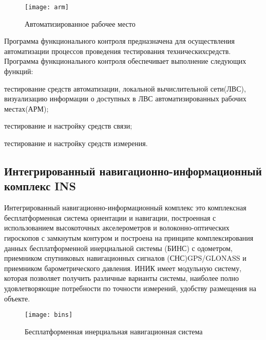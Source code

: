\begin{figure}[ht]
	\centering
	\texttt{[image: arm]}
	\caption{Автоматизированное рабочее место}
	\label{fig:lit_reiview:analytics:arm}
\end{figure}

Программа функционального контроля предназначена для осуществления автоматизации процессов проведения тестирования
технических\break средств.
Программа функционального контроля обеспечивает выполнение следующих функций:
\begin{legal}
    \item тестирование средств автоматизации, локальной вычислительной сети(ЛВС), визуализацию информации о доступных в ЛВС автоматизированных рабочих местах(АРМ);
    \item тестирование и настройку средств связи;
    \item тестирование и настройку средств измерения.
\end{legal}

\subsection{Интегрированный навигационно-информационный комплекс INS}
\label{sub:lit_review:ins}

Интегрированный навигационно-информационный комплекс это комплексная бесплатформенная система ориентации и навигации,
построенная с использованием высокоточных акселерометров и волоконно-оптических гироскопов с замкнутым контуром и
построена на принципе комплексирования данных бесплатформенной инерциальной системы (БИНС) с одометром, приемником
спутниковых навигационных сигналов (СНС)\break GPS/GLONASS и приемником барометрического давления.
ИНИК имеет модульную систему, которая позволяет получить различные варианты системы, наиболее полно удовлетворяющие потребности по точности измерений, удобству размещения на объекте.

\begin{figure}[ht]
	\centering
	\texttt{[image: bins]}
	\caption{Бесплатформенная инерциальная навигационная система}
	\label{fig:lit_reiview:ins:bins}
\end{figure}

